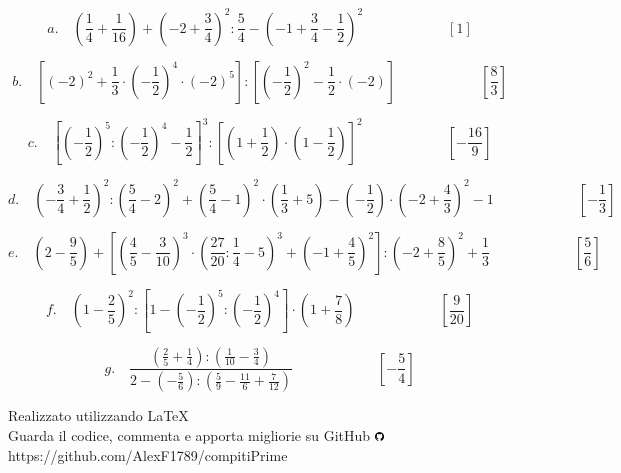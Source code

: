\documentclass[]{article}
\begin{document}
\begin{enumerate}
		\[a.\quad\left(\frac14+\frac1{16}\right)+\left(-2+\frac34\right)^2:\frac54-\left(-1+\frac34-\frac12\right)^2\qquad\qquad\qquad\left[1\right]\]
		
		\[b.\quad\left[(-2)^2+\frac13\cdot\left(-\frac12\right)^4\cdot(-2)^5\right]:\left[\left(-\frac12\right)^2-\frac12\cdot(-2)\right]\qquad\qquad\qquad\left[\frac83\right]\]
		
		\[c.\quad\left[\left(-\frac12\right)^5:\left(-\frac12\right)^4-\frac12\right]^3:\left[\left(1+\frac12\right)\cdot\left(1-\frac12\right)\right]^2\qquad\qquad\qquad\left[-\frac{16}9\right]\]
		
		\[d.\quad\left(-\frac34+\frac12\right)^2:\left(\frac54-2\right)^2+\left(\frac54-1\right)^2\cdot\left(\frac13+5\right)-\left(-\frac12\right)\cdot\left(-2+\frac43\right)^2-1\qquad\qquad\qquad\left[-\frac13\right]\]
		
		\[e.\quad\left(2-\frac95\right)+\left[\left(\frac45-\frac3{10}\right)^3\cdot\left(\frac{27}{20}:\frac14-5\right)^3+\left(-1+\frac45\right)^2\right]:\left(-2+\frac85\right)^2+\frac13\qquad\qquad\qquad\left[\frac56\right]\]
		
		\[f.\quad\left(1-\frac25\right)^2:\left[1-\left(-\frac12\right)^5:\left(-\frac12\right)^4\right]\cdot\left(1+\frac78\right)\qquad\qquad\qquad\left[\frac9{20}\right]\]
		
		\[g.\quad\frac{\left(\frac25+\frac14\right):\left(\frac1{10}-\frac34\right)}{2-\left(-\frac56\right):\left(\frac59-\frac{11}6+\frac7{12}\right)}\qquad\qquad\qquad\left[-\frac54\right]\]
		
		
\end{enumerate}

\vfill

\begin{center}
	Realizzato utilizzando \LaTeX \\ Guarda il codice, commenta e apporta migliorie su GitHub \includegraphics[height=0.25cm]{git} \\ \parskip=25pt
\tiny{https://github.com/AlexF1789/compitiPrime}
\end{center}
\end{document}
